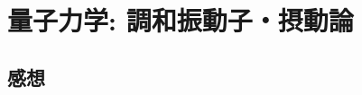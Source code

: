 \documentclass[../../sp_2019.tex]{subfiles}
\begin{document}
\setcounter{section}{0}
\section{量子力学: 調和振動子・摂動論}
\subsection{}



\subsection*{感想}
\end{document}

